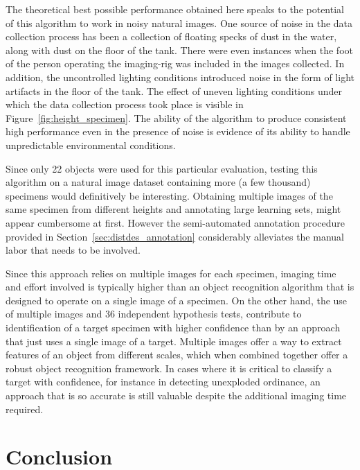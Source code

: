 The theoretical best possible performance obtained here speaks to the potential of this algorithm to work in noisy natural images. One source of noise in the data collection process has been a collection of floating specks of dust in the water, along with dust on the floor of the tank. There were even instances when the foot of the person operating the imaging-rig was included in the images collected. In addition, the uncontrolled lighting conditions introduced noise in the form of light artifacts in the floor of the tank. The effect of uneven lighting conditions under which the data collection process took place is visible in Figure~\ref{fig:height_specimen}. The ability of the algorithm to produce consistent high performance even in the presence of noise is evidence of its ability to handle unpredictable environmental conditions.

Since only 22 objects were used for this particular evaluation, testing this algorithm on a natural image dataset containing more (a few thousand) specimens would definitively be interesting. Obtaining multiple images of the same specimen from different heights and annotating large learning sets, might appear cumbersome at first. However the semi-automated annotation procedure provided in Section~\ref{sec:distdes_annotation} considerably alleviates the manual labor that needs to be involved.

Since this approach relies on multiple images for each specimen, imaging time and effort involved is typically higher than an object recognition algorithm that is designed to operate on a single image of a specimen. On the other hand, the use of multiple images and 36 independent hypothesis tests, contribute to identification of a target specimen with higher confidence than by an approach that just uses a single image of a target. Multiple images offer a way to extract features of an object from different scales, which when combined together offer a robust object recognition framework. In cases where it is critical to classify a target with confidence, for instance in detecting unexploded ordinance, an approach that is so accurate is still valuable despite the additional imaging time required.

\section{Conclusion}

